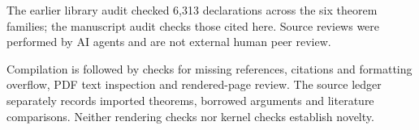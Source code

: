 The earlier library audit checked 6,313 declarations across the six theorem
families; the manuscript audit checks those cited here. Source reviews were
performed by AI agents and are not external human peer review.

Compilation is followed by checks for missing references, citations and
formatting overflow, PDF text inspection and rendered-page review. The source ledger
separately records imported theorems, borrowed arguments and literature
comparisons. Neither rendering checks nor kernel checks establish novelty.
